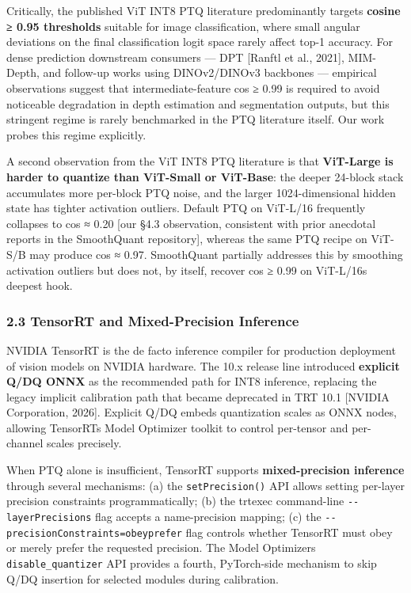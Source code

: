 \documentclass[
]{article}
\begin{document}
Critically, the published ViT INT8 PTQ literature predominantly targets
\textbf{cosine ≥ 0.95 thresholds} suitable for image classification,
where small angular deviations on the final classification logit space
rarely affect top-1 accuracy. For dense prediction downstream consumers
--- DPT {[}Ranftl et al., 2021{]}, MIM-Depth, and follow-up works using
DINOv2/DINOv3 backbones --- empirical observations suggest that
intermediate-feature cos ≥ 0.99 is required to avoid noticeable
degradation in depth estimation and segmentation outputs, but this
stringent regime is rarely benchmarked in the PTQ literature itself. Our
work probes this regime explicitly.

A second observation from the ViT INT8 PTQ literature is that
\textbf{ViT-Large is harder to quantize than ViT-Small or ViT-Base}: the
deeper 24-block stack accumulates more per-block PTQ noise, and the
larger 1024-dimensional hidden state has tighter activation outliers.
Default PTQ on ViT-L/16 frequently collapses to cos ≈ 0.20 {[}our §4.3
observation, consistent with prior anecdotal reports in the SmoothQuant
repository{]}, whereas the same PTQ recipe on ViT-S/B may produce cos ≈
0.97. SmoothQuant partially addresses this by smoothing activation
outliers but does not, by itself, recover cos ≥ 0.99 on
ViT-L/16\textquotesingle s deepest hook.

\subsubsection{2.3 TensorRT and Mixed-Precision
Inference}\label{23-tensorrt-and-mixed-precision-inference}

NVIDIA TensorRT is the de facto inference compiler for production
deployment of vision models on NVIDIA hardware. The 10.x release line
introduced \textbf{explicit Q/DQ ONNX} as the recommended path for INT8
inference, replacing the legacy implicit calibration path that became
deprecated in TRT 10.1 {[}NVIDIA Corporation, 2026{]}. Explicit Q/DQ
embeds quantization scales as ONNX nodes, allowing
TensorRT\textquotesingle s Model Optimizer toolkit to control per-tensor
and per-channel scales precisely.

When PTQ alone is insufficient, TensorRT supports
\textbf{mixed-precision inference} through several mechanisms: (a) the
\texttt{setPrecision()} API allows setting per-layer precision
constraints programmatically; (b) the trtexec command-line
\texttt{-\/-layerPrecisions} flag accepts a name-precision mapping; (c)
the \texttt{-\/-precisionConstraints=obey\textbar{}prefer} flag controls
whether TensorRT must obey or merely prefer the requested precision. The
Model Optimizer\textquotesingle s \texttt{disable\_quantizer} API
provides a fourth, PyTorch-side mechanism to skip Q/DQ insertion for
selected modules during calibration.
\end{document}

